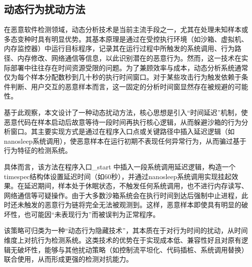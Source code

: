 \subsection{动态行为扰动方法}

在恶意软件检测领域，动态分析技术是当前主流手段之一，尤其在处理未知样本或多态变种时具有明显优势。其基本原理是通过在受控执行环境（如沙箱、虚拟机、内存监控器）中运行目标程序，记录其在运行过程中所触发的系统调用、行为路径、内存修改、网络通信等信息，以此识别潜在的恶意行为。然而，这一技术在实际部署中往往存在时间资源受限的问题。为了兼顾效率与成本，动态分析系统通常仅为每个样本分配数秒到几十秒的执行时间窗口。对于某些攻击行为触发依赖于条件判断、用户交互的恶意样本而言，这一固定的分析时间窗显然存在被规避的可能性。

基于此观察，本文设计了一种动态扰动方法，核心思想是引入“时间延迟”机制，使恶意代码在样本启动后故意等待一段时间再执行核心逻辑，从而躲避沙箱的行为分析窗口。其主要实现方式是通过在程序入口点或关键路径中插入延迟逻辑（如 nanosleep系统调用），使恶意样本在运行初期不表现任何异常行为，从而骗过基于行为特征的检测系统。

具体而言，该方法在程序入口\_start 中插入一段系统调用延迟逻辑，构造一个 timespec结构体设置延迟时间（如60秒），并通过nanosleep系统调用实现挂起效果。在延迟期间，样本处于休眠状态，不触发任何系统调用，也不进行内存读写、网络通信等可疑操作。由于大多数沙箱系统会在执行时间到达后强制中止进程，此时还未触发的恶意行为链将完全无法被观测到。这样，恶意样本即使具有明显的破坏性，也可能因“未表现行为”而被误判为正常程序。

该策略可归类为一种“动态行为隐藏技术”，其本质在于对行为时间的扰动，从时间维度上对抗行为检测系统。这类技术的优势在于实现成本低、兼容性好且对原有逻辑无破坏性，能够与其他扰动策略（如控制流平坦化、代码插桩、系统调用替换）联合使用，从而形成更强的检测对抗能力。

